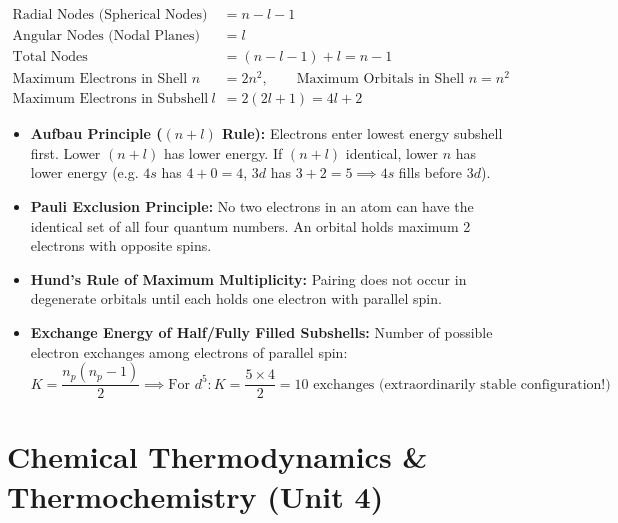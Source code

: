 \documentclass[11pt,a4paper]{article}
\begin{document}
\begin{formulabox}
\begin{align}
  \text{Radial Nodes (Spherical Nodes)} &= n - l - 1 \\
  \text{Angular Nodes (Nodal Planes)} &= l \\
  \text{Total Nodes} &= (n - l - 1) + l = n - 1 \\
  \text{Maximum Electrons in Shell } n &= 2n^2, \qquad \text{Maximum Orbitals in Shell } n = n^2 \\
  \text{Maximum Electrons in Subshell } l &= 2(2l + 1) = 4l + 2
\end{align}
\end{formulabox}

\begin{usecasebox}
\begin{itemize}
  \item \textbf{Aufbau Principle ($(n + l)$ Rule):} Electrons enter lowest energy subshell first. Lower $(n+l)$ has lower energy. If $(n+l)$ identical, lower $n$ has lower energy (e.g. $4s$ has $4+0=4$, $3d$ has $3+2=5 \implies 4s$ fills before $3d$).
  \item \textbf{Pauli Exclusion Principle:} No two electrons in an atom can have the identical set of all four quantum numbers. An orbital holds maximum 2 electrons with opposite spins.
  \item \textbf{Hund's Rule of Maximum Multiplicity:} Pairing does not occur in degenerate orbitals until each holds one electron with parallel spin.
  \item \textbf{Exchange Energy of Half/Fully Filled Subshells:} Number of possible electron exchanges among electrons of parallel spin:
  \begin{equation*}
    K = \frac{n_p(n_p - 1)}{2} \implies \text{For } d^5: K = \frac{5\times 4}{2} = 10 \text{ exchanges (extraordinarily stable configuration!)}
  \end{equation*}
\end{itemize}
\end{usecasebox}

\newpage

\section{Chemical Thermodynamics \& Thermochemistry (Unit 4)}
\end{document}
